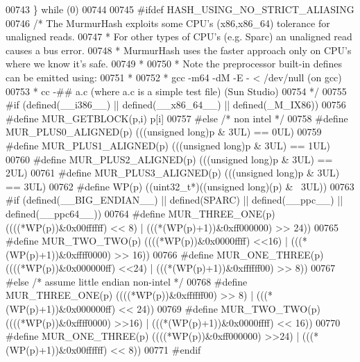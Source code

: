 \begin{DoxyCode}
{{{{{{{{00743 \textcolor{preprocessor}{\} while (0)}
00744 
00745 \textcolor{preprocessor}{#ifdef HASH\_USING\_NO\_STRICT\_ALIASING}
00746 \textcolor{comment}{/* The MurmurHash exploits some CPU's (x86,x86\_64) tolerance for unaligned reads.}
00747 \textcolor{comment}{ * For other types of CPU's (e.g. Sparc) an unaligned read causes a bus error.}
00748 \textcolor{comment}{ * MurmurHash uses the faster approach only on CPU's where we know it's safe.}
00749 \textcolor{comment}{ *}
00750 \textcolor{comment}{ * Note the preprocessor built-in defines can be emitted using:}
00751 \textcolor{comment}{ *}
00752 \textcolor{comment}{ *   gcc -m64 -dM -E - < /dev/null                  (on gcc)}
00753 \textcolor{comment}{ *   cc -## a.c (where a.c is a simple test file)   (Sun Studio)}
00754 \textcolor{comment}{ */}
00755 \textcolor{preprocessor}{#if (defined(\_\_i386\_\_) || defined(\_\_x86\_64\_\_)  || defined(\_M\_IX86))}
00756 \textcolor{preprocessor}{#define MUR\_GETBLOCK(p,i) p[i]}
00757 \textcolor{preprocessor}{#else }\textcolor{comment}{/* non intel */}\textcolor{preprocessor}{}
00758 \textcolor{preprocessor}{#define MUR\_PLUS0\_ALIGNED(p) (((unsigned long)p & 3UL) == 0UL)}
00759 \textcolor{preprocessor}{#define MUR\_PLUS1\_ALIGNED(p) (((unsigned long)p & 3UL) == 1UL)}
00760 \textcolor{preprocessor}{#define MUR\_PLUS2\_ALIGNED(p) (((unsigned long)p & 3UL) == 2UL)}
00761 \textcolor{preprocessor}{#define MUR\_PLUS3\_ALIGNED(p) (((unsigned long)p & 3UL) == 3UL)}
00762 \textcolor{preprocessor}{#define WP(p) ((uint32\_t*)((unsigned long)(p) & ~3UL))}
00763 \textcolor{preprocessor}{#if (defined(\_\_BIG\_ENDIAN\_\_) || defined(SPARC) || defined(\_\_ppc\_\_) || defined(\_\_ppc64\_\_))}
00764 \textcolor{preprocessor}{#define MUR\_THREE\_ONE(p) ((((*WP(p))&0x00ffffff) << 8) | (((*(WP(p)+1))&0xff000000) >> 24))}
00765 \textcolor{preprocessor}{#define MUR\_TWO\_TWO(p)   ((((*WP(p))&0x0000ffff) <<16) | (((*(WP(p)+1))&0xffff0000) >> 16))}
00766 \textcolor{preprocessor}{#define MUR\_ONE\_THREE(p) ((((*WP(p))&0x000000ff) <<24) | (((*(WP(p)+1))&0xffffff00) >>  8))}
00767 \textcolor{preprocessor}{#else }\textcolor{comment}{/* assume little endian non-intel */}\textcolor{preprocessor}{}
00768 \textcolor{preprocessor}{#define MUR\_THREE\_ONE(p) ((((*WP(p))&0xffffff00) >> 8) | (((*(WP(p)+1))&0x000000ff) << 24))}
00769 \textcolor{preprocessor}{#define MUR\_TWO\_TWO(p)   ((((*WP(p))&0xffff0000) >>16) | (((*(WP(p)+1))&0x0000ffff) << 16))}
00770 \textcolor{preprocessor}{#define MUR\_ONE\_THREE(p) ((((*WP(p))&0xff000000) >>24) | (((*(WP(p)+1))&0x00ffffff) <<  8))}
00771 \textcolor{preprocessor}{#endif}
}}}}}}}}
\end{DoxyCode}
